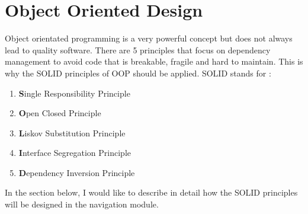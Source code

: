 \section{Object Oriented Design}
    Object orientated programming is a very powerful concept but does not always lead to quality
    software. There are 5 principles that focus on dependency management to avoid code that
    is breakable, fragile and hard to maintain. This is why the SOLID \cite{Hotop2015} 
    principles of OOP should be applied.
    SOLID stands for :
    \begin{enumerate}
        \item 
            \textbf{S}ingle Responsibility Principle
        \item 
            \textbf{O}pen Closed Principle
        \item 
            \textbf{L}iskov Substitution Principle
        \item 
            \textbf{I}nterface Segregation Principle
        \item 
            \textbf{D}ependency Inversion Principle
    \end{enumerate}
    In the section below, I would like to describe in detail how the SOLID principles will 
    be designed in the navigation module.

